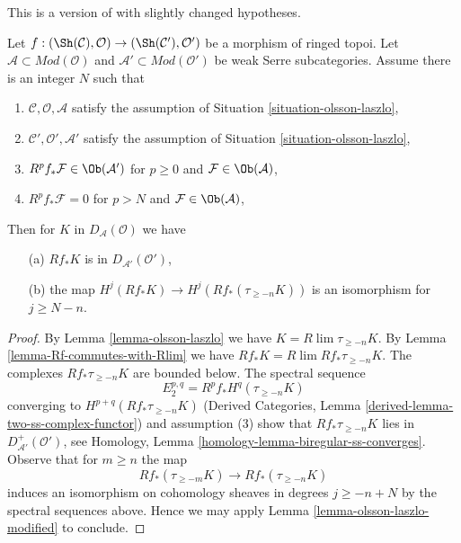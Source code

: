 \begin{lemma}
\label{lemma-olsson-laszlo-map-version-one}
\begin{reference}
This is a version of \cite[Lemma 2.1.10]{six-I} with slightly changed
hypotheses.
\end{reference}
Let $f : (\Sh(\mathcal{C}), \mathcal{O}) \to (\Sh(\mathcal{C}'), \mathcal{O}')$
be a morphism of ringed topoi.
Let $\mathcal{A} \subset \textit{Mod}(\mathcal{O})$
and $\mathcal{A}' \subset \textit{Mod}(\mathcal{O}')$
be weak Serre subcategories. Assume there is an integer $N$ such that
\begin{enumerate}
\item $\mathcal{C}, \mathcal{O}, \mathcal{A}$ satisfy the
assumption of Situation \ref{situation-olsson-laszlo},
\item $\mathcal{C}', \mathcal{O}', \mathcal{A}'$ satisfy the
assumption of Situation \ref{situation-olsson-laszlo},
\item $R^pf_*\mathcal{F} \in \Ob(\mathcal{A}')$ for
$p \geq 0$ and $\mathcal{F} \in \Ob(\mathcal{A})$,
\item $R^pf_*\mathcal{F} = 0$ for
$p > N$ and $\mathcal{F} \in \Ob(\mathcal{A})$,
\end{enumerate}
Then for $K$ in $D_\mathcal{A}(\mathcal{O})$ we have
\begin{enumerate}
\item[(a)] $Rf_*K$ is in $D_{\mathcal{A}'}(\mathcal{O}')$,
\item[(b)] the map
$H^j(Rf_*K) \to H^j(Rf_*(\tau_{\geq -n}K))$ is an isomorphism
for $j \geq N - n$.
\end{enumerate}
\end{lemma}

\begin{proof}
By Lemma \ref{lemma-olsson-laszlo} we have $K = R\lim \tau_{\geq -n}K$.
By Lemma \ref{lemma-Rf-commutes-with-Rlim}
we have $Rf_*K = R\lim Rf_*\tau_{\geq -n}K$.
The complexes $Rf_*\tau_{\geq -n}K$ are bounded below.
The spectral sequence
$$
E_2^{p, q} = R^pf_*H^q(\tau_{\geq -n}K)
$$
converging to $H^{p + q}(Rf_*\tau_{\geq -n}K)$
(Derived Categories, Lemma \ref{derived-lemma-two-ss-complex-functor})
and assumption (3)
show that $Rf_*\tau_{\geq -n}K$ lies in $D^+_{\mathcal{A}'}(\mathcal{O}')$,
see Homology, Lemma \ref{homology-lemma-biregular-ss-converges}.
Observe that for $m \geq n$ the map
$$
Rf_*(\tau_{\geq -m}K) \longrightarrow Rf_*(\tau_{\geq -n}K)
$$
induces an isomorphism on cohomology sheaves in degrees $j \geq -n + N$
by the spectral sequences above. Hence we may apply
Lemma \ref{lemma-olsson-laszlo-modified} to conclude.
\end{proof}

